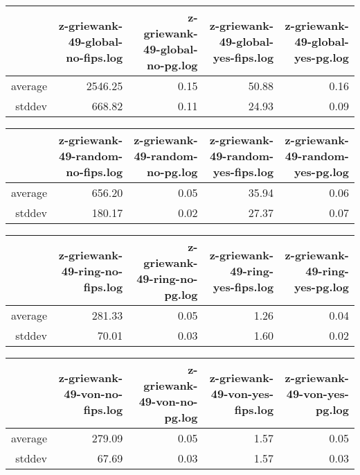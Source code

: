 \begin{table}[ht]
\centering
\begin{tabular}{rrrrr}
  \hline
 & z-griewank-49-global-no-fips.log & z-griewank-49-global-no-pg.log & z-griewank-49-global-yes-fips.log & z-griewank-49-global-yes-pg.log \\ 
  \hline
average & 2546.25 & 0.15 & 50.88 & 0.16 \\ 
  stddev & 668.82 & 0.11 & 24.93 & 0.09 \\ 
   \hline
\end{tabular}
\end{table}
\begin{table}[ht]
\centering
\begin{tabular}{rrrrr}
  \hline
 & z-griewank-49-random-no-fips.log & z-griewank-49-random-no-pg.log & z-griewank-49-random-yes-fips.log & z-griewank-49-random-yes-pg.log \\ 
  \hline
average & 656.20 & 0.05 & 35.94 & 0.06 \\ 
  stddev & 180.17 & 0.02 & 27.37 & 0.07 \\ 
   \hline
\end{tabular}
\end{table}
\begin{table}[ht]
\centering
\begin{tabular}{rrrrr}
  \hline
 & z-griewank-49-ring-no-fips.log & z-griewank-49-ring-no-pg.log & z-griewank-49-ring-yes-fips.log & z-griewank-49-ring-yes-pg.log \\ 
  \hline
average & 281.33 & 0.05 & 1.26 & 0.04 \\ 
  stddev & 70.01 & 0.03 & 1.60 & 0.02 \\ 
   \hline
\end{tabular}
\end{table}
\begin{table}[ht]
\centering
\begin{tabular}{rrrrr}
  \hline
 & z-griewank-49-von-no-fips.log & z-griewank-49-von-no-pg.log & z-griewank-49-von-yes-fips.log & z-griewank-49-von-yes-pg.log \\ 
  \hline
average & 279.09 & 0.05 & 1.57 & 0.05 \\ 
  stddev & 67.69 & 0.03 & 1.57 & 0.03 \\ 
   \hline
\end{tabular}
\end{table}

